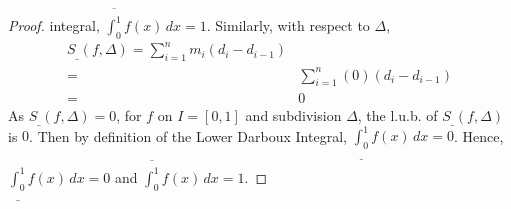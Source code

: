 \documentclass{article}
\begin{document}
\begin{proof}
    integral, $\overline{\int_{0}^{1}}f(x) \, dx = 1$. Similarly, with respect 
    to $\Delta$,
    \begin{align*}
      S_{\_}(f, \Delta) = \sum_{i=1}^{n} m_{i}(d_i - d_{i-1})
      \tag{by definition of Lower Darboux Sum}\\
      =& \sum_{i=1}^{n} (0)(d_i - d_{i-1}) \tag{since $m_i=0$}\\
      =& 0
    \end{align*}
    As $S_{\_}(f,\Delta) = 0$, for $f$ on $I=[0,1]$ and subdivision $\Delta$, 
    the l.u.b. of $S_{\_}(f,\Delta)$ is $0$. Then by definition of the Lower 
    Darboux Integral, $\underline{\int_{0}^{1}}f(x) \, dx = 0$.
    Hence, $\underline{\int_{0}^{1}}f(x) \, dx = 0$ and
    $\overline{\int_{0}^{1}}f(x) \, dx = 1$.
  \end{proof}
\end{document}
